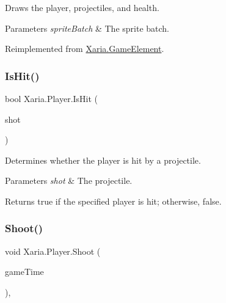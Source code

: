 Draws the player, projectiles, and health. 
\begin{DoxyParams}{Parameters}
{\em sprite\+Batch} & The sprite batch.\\
\hline
\end{DoxyParams}




Reimplemented from \hyperlink{classXaria_1_1GameElement_a812e0ffbe54519a3fb14a49115bf43d9}{Xaria.\+Game\+Element}.

\mbox{\label{classXaria_1_1Player_a75f034f442c2afb88d445ea6968c9a1d}} 
\subsubsection{\texorpdfstring{Is\+Hit()}{IsHit()}}
{\footnotesize\ttfamily bool Xaria.\+Player.\+Is\+Hit (\begin{DoxyParamCaption}\item[{Projectile}]{shot }\end{DoxyParamCaption})\hspace{0.3cm}{\ttfamily [inline]}}



Determines whether the player is hit by a projectile. 


\begin{DoxyParams}{Parameters}
{\em shot} & The projectile.\\
\hline
\end{DoxyParams}
\begin{DoxyReturn}{Returns}
{\ttfamily true} if the specified player is hit; otherwise, {\ttfamily false}. 
\end{DoxyReturn}
\mbox{\label{classXaria_1_1Player_a9449bb24ef3a669d4d8081c652811b7c}} 
\subsubsection{\texorpdfstring{Shoot()}{Shoot()}}
{\footnotesize\ttfamily void Xaria.\+Player.\+Shoot (\begin{DoxyParamCaption}\item[{Game\+Time}]{game\+Time }\end{DoxyParamCaption})\hspace{0.3cm}{\ttfamily [inline]}, {\ttfamily [package]}}




